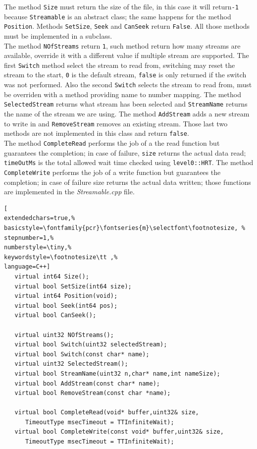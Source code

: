 The method \texttt{Size} must return the size of the file, in this case it will return\texttt{-1} because \texttt{Streamable} is an abstract class; the same happens for the method \texttt{Position}. Methods \texttt{SetSize}, \texttt{Seek} and \texttt{CanSeek} return \texttt{False}. All those methods must be implemented in a subclass. \\


The method \texttt{NOfStreams} return \texttt{1}, such method return how many streams are available, override it with a different value if multiple stream are supported. The first \texttt{Switch} method select the stream to read from, switching may reset the stream to the start, \texttt{0} is the default stream, \texttt{false} is only returned if the switch was not performed. Also the second \texttt{Switch} selects the stream to read from, must be overriden with a method providing name to number mapping. The method \texttt{SelectedStream} returns what stream has been selected and \texttt{StreamName} returns the name of the stream we are using.
The method \texttt{AddStream} adds a new stream to write in and \texttt{RemoveStream} removes an existing stream. Those last two methods are not implemented in this class and return \texttt{false}.\\


The method \texttt{CompleteRead} performs the job of a the read function but guarantees the completion; in case of failure, \texttt{size} returns the actual data read; \texttt{timeOutMs} is the total allowed wait time checked using \texttt{level0::HRT}. The method \texttt{CompleteWrite} performs the job of a write function but guarantees the completion; in case of failure size returns the actual data written; those functions are implemented in the \textit{Streamable.cpp} file.
\begin{lstlisting}[
extendedchars=true,%
basicstyle=\fontfamily{pcr}\fontseries{m}\selectfont\footnotesize, %
stepnumber=1,%
numberstyle=\tiny,%
keywordstyle=\footnotesize\tt ,%
language=C++]
   virtual int64 Size();
   virtual bool SetSize(int64 size);
   virtual int64 Position(void);
   virtual bool Seek(int64 pos);
   virtual bool CanSeek();

   virtual uint32 NOfStreams();
   virtual bool Switch(uint32 selectedStream);
   virtual bool Switch(const char* name);
   virtual uint32 SelectedStream();
   virtual bool StreamName(uint32 n,char* name,int nameSize);
   virtual bool AddStream(const char* name);
   virtual bool RemoveStream(const char *name);

   virtual bool CompleteRead(void* buffer,uint32& size,
      TimeoutType msecTimeout = TTInfiniteWait);
   virtual bool CompleteWrite(const void* buffer,uint32& size,
      TimeoutType msecTimeout = TTInfiniteWait);
\end{lstlisting}


